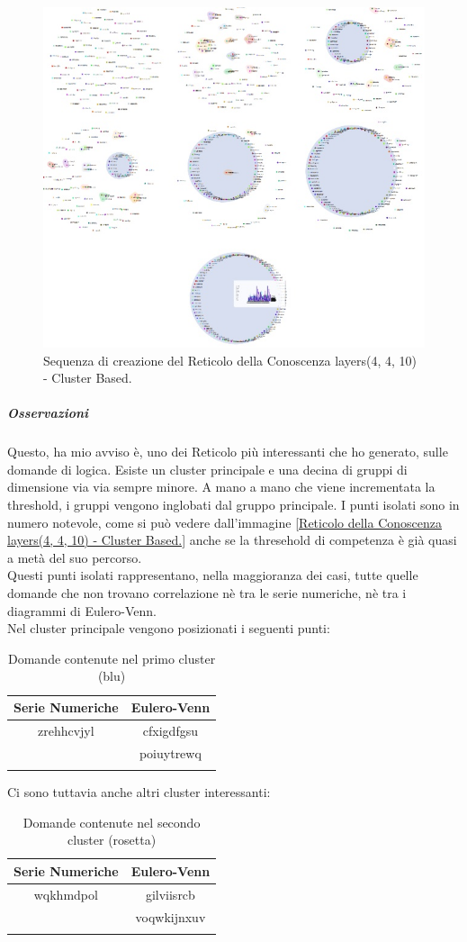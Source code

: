 \begin{figure}[H]
\centering
	\includegraphics[width=0.70\linewidth]{./image/collage_reticolo-logica(4,4,10).png}
	\caption{Sequenza di creazione del Reticolo della Conoscenza layers(4, 4, 10) - Cluster Based.}
	\label{Sequenza di creazione del Reticolo della Conoscenza layers(4, 4, 10) - Cluster Based.}
\end{figure}
\noindent

\subparagraph{Osservazioni}\mbox{}
\noindent
Questo, ha mio avviso \`e, uno dei Reticolo pi\`u interessanti che ho generato, sulle domande di logica.
Esiste un cluster principale e una decina di gruppi di dimensione via via sempre minore. A mano a mano che viene incrementata la threshold, i gruppi vengono inglobati dal gruppo principale. I punti isolati sono in numero notevole, come si pu\`o vedere dall'immagine \ref{Reticolo della Conoscenza layers(4, 4, 10) - Cluster Based.} anche se la thresehold di competenza \`e gi\`a quasi a met\`a del suo percorso.\\
Questi punti isolati rappresentano, nella maggioranza dei casi, tutte quelle domande che non trovano correlazione n\`e tra le serie numeriche, n\`e tra i diagrammi di Eulero-Venn.\\
Nel cluster principale vengono posizionati i seguenti punti:
\begin{longtable}{|c|c|}
	\hline
	\textbf{Serie Numeriche} & \textbf{Eulero-Venn} \\\hline\hline
	zrehhcvjyl & cfxigdfgsu \\
	           & poiuytrewq \\
	
\hline
\caption{Domande contenute nel primo cluster (blu)}\label{tab:Domande contenute nel primo cluster}
\end{longtable}
\noindent
Ci sono tuttavia anche altri cluster interessanti:
\begin{longtable}{|c|c|}
	\hline
	\textbf{Serie Numeriche} & \textbf{Eulero-Venn} \\\hline\hline
	wqkhmdpol & gilviisrcb \\
	           & voqwkijnxuv\\
	
\hline
\caption{Domande contenute nel secondo cluster (rosetta)}\label{tab:Domande contenute nel secondo cluster}
\end{longtable}
\noindent

